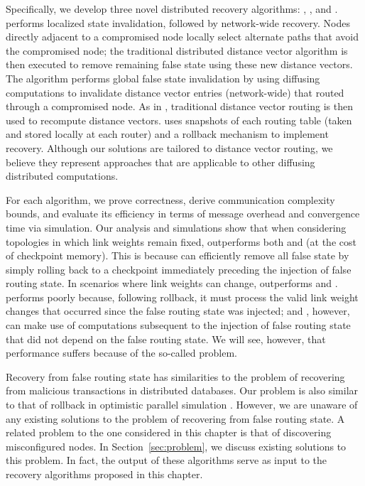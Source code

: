 Specifically, we develop three novel distributed recovery algorithms: \seconds, \purges, and \cprs. \second performs localized state invalidation, followed by network-wide recovery. 
Nodes directly adjacent to a compromised node locally select alternate paths that avoid the compromised node; the traditional distributed distance vector algorithm is then executed to 
remove remaining false state using these new distance vectors. The \purge algorithm performs global false state invalidation by using diffusing computations to invalidate distance vector 
entries (network-wide) that routed through a compromised node. As in \seconds, traditional distance vector routing is then used to recompute distance vectors. 
\cpr uses snapshots of each routing table (taken and stored locally at each router) and a rollback mechanism to implement recovery.
Although our solutions are tailored to distance vector routing, we believe they represent approaches that are applicable to other diffusing distributed computations. 

For each algorithm, we prove correctness, derive communication complexity bounds, and evaluate its efficiency in terms of message overhead and convergence time via simulation. 
Our analysis and simulations show that when considering topologies in which link weights remain fixed, \cpr outperforms both \purge and \second (at the cost of checkpoint memory). This is because \cpr can efficiently remove all false state by simply rolling back
to a checkpoint immediately preceding the injection of false routing state. In scenarios where link weights can change, \purge outperforms \cpr and \seconds. \cpr performs poorly because, following 
rollback, it must process the valid link weight changes that occurred since the false routing state was injected;  \second and \purges, however, can make use of computations subsequent to the 
injection of false routing state that did not depend on the false routing state. We will see, however, that \second performance suffers because of the so-called \infinity problem.


Recovery from false routing state has similarities to the problem of
recovering from malicious transactions \cite{Liu98, Liu00} in
distributed databases. Our problem is also similar to that of rollback
in optimistic parallel simulation \cite{Jeff}. However, we are unaware
of any existing solutions to the problem of recovering from false
routing state. A related problem to the one considered in this
chapter is that of discovering misconfigured nodes. In
Section~\ref{sec:problem}, we discuss existing solutions to this
problem. In fact, the output of these algorithms serve as input to the
recovery algorithms proposed in this chapter.

